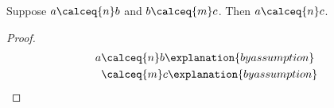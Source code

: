 

\begin{proposition}\label{calculation_mismatched_parameters}
    Suppose $a\calceq{n}b$ and $b\calceq{m}c$.
    Then $a\calceq{n}c$.
\end{proposition}
\begin{proof}
    \begin{align*} a &\calceq{n}b \explanation{by assumption} \\ &\calceq{m}c \explanation{by assumption} \end{align*}
\end{proof}
